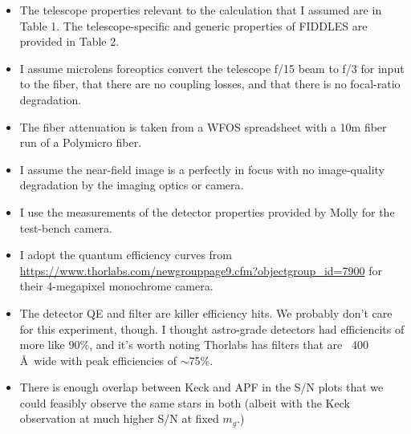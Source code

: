 \documentclass[onecolumn,floatfix,tighten]{aastex62}
\begin{document}
\begin{itemize}
\item The telescope properties relevant to the calculation that I
assumed are in Table 1. The telescope-specific and generic properties
of FIDDLES are provided in Table 2.

\item I assume microlens foreoptics convert the telescope f/15 beam
to f/3 for input to the fiber, that there are no coupling losses, and
that there is no focal-ratio degradation.

\item The fiber attenuation is taken from a WFOS spreadsheet with a
10m fiber run of a Polymicro fiber.

\item I assume the near-field image is a perfectly in focus with no
image-quality degradation by the imaging optics or camera.

\item I use the measurements of the detector properties provided by
Molly for the test-bench camera.

\item I adopt the quantum efficiency curves from
\url{https://www.thorlabs.com/newgrouppage9.cfm?objectgroup_id=7900}
for their 4-megapixel monochrome camera.

\end{itemize}

\begin{itemize}

\item The detector QE and filter are killer efficiency hits. We
probably don't care for this experiment, though. I thought
astro-grade detectors had efficiencits of more like 90\%, and it's
worth noting Thorlabs has filters that are ~400 \AA\ wide with peak
efficiencies of $\sim$75\%.

\item There is enough overlap between Keck and APF in the S/N plots
that we could feasibly observe the same stars in both (albeit with
the Keck observation at much higher S/N at fixed $m_g$.)

\end{itemize}

\end{document}
